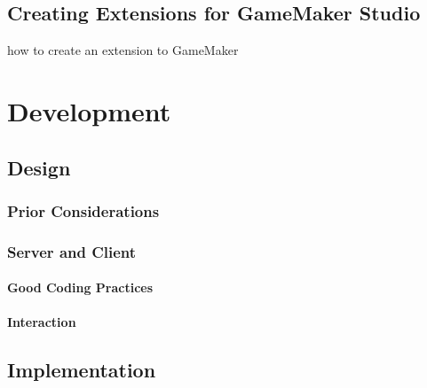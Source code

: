 \documentclass[bsc,frontabs,twoside,singlespacing,parskip,deptreport]{infthesis}     %
\begin{document}
\section{Creating Extensions for GameMaker Studio}
how to create an extension to GameMaker



\chapter{Development}
\section{Design}
\subsection{Prior Considerations}
\subsection{Server and Client}
\subsubsection{Good Coding Practices}
\subsubsection{Interaction}

\section{Implementation}
\end{document}
